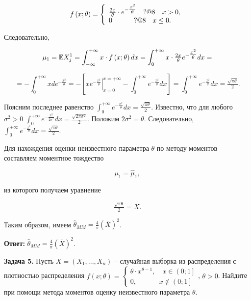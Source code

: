 \[f\left(x;\theta \right)=\left\{\begin{array}{l} {{\tfrac{2x}{\theta }} \cdot e^{-{\tfrac{x^{2} }{\theta }} } \quad {\rm ?@8}\quad x>0,} \\ {0\quad \quad \quad \, {\rm ?@8}\quad x\le 0.} \end{array}\right. \] 

Следовательно,

\[\mu _{1} ={\rm {\mathbb E}}X_{j}^{1} =\int _{-\infty }^{+\infty }x\cdot f\left(x;\theta \right)dx =\int _{0}^{+\infty }x\cdot {\tfrac{2x}{\theta }} e^{-{\tfrac{x^{2} }{\theta }} } dx =\] 

\[=-\int _{0}^{+\infty }xde^{-{\tfrac{x^{2} }{\theta }} }  =-\left[\left. xe^{-{\tfrac{x^{2} }{\theta }} } \right|_{x=0}^{x=+\infty } -\int _{0}^{+\infty }e^{-{\tfrac{x^{2} }{\theta }} } dx \right]=\int _{0}^{+\infty }e^{-{\tfrac{x^{2} }{\theta }} } dx ={\tfrac{\sqrt{\pi \theta } }{2}} .\] 

Поясним последнее равенство $\int _{0}^{+\infty }e^{-{\tfrac{x^{2} }{\theta }} } dx ={\tfrac{\sqrt{\pi \theta } }{2}} $. Известно, что для любого $\sigma ^{2} >0$ $\int _{0}^{+\infty }e^{-{\tfrac{x^{2} }{2\sigma ^{2} }} } dx ={\tfrac{\sqrt{2\pi \sigma ^{2} } }{2}} $. Положим $2\sigma ^{2} =\theta $. Следовательно, $\int _{0}^{+\infty }e^{-{\tfrac{x^{2} }{\theta }} } dx ={\tfrac{\sqrt{\pi \theta } }{2}} $.

Для нахождения оценки неизвестного параметра $\theta $ по методу моментов составляем моментное тождество 

\[\mu _{1} =\widehat{\mu }_{1} ,\] 

из которого получаем уравнение

\[{\tfrac{\sqrt{\pi \theta } }{2}} =\overline{X}.\] 

Таким образом, имеем $\widehat{\theta }_{MM} =\frac{4}{\pi } \left(\overline{X}\right)^{2} $.

\textbf{Ответ: }$\widehat{\theta }_{MM} =\frac{4}{\pi } \left(\overline{X}\right)^{2} $.

\textbf{Задача 5.} Пусть $X=\left(X_{1} ,...,X_{n} \right)$ -- случайная выборка из распределения с плотностью распределения $f\left(x;\theta \right)=\left\{\begin{array}{l} {\theta \cdot x^{\theta -1} ,\quad x\in \left(0;1\right]} \\ {0,\quad \quad \quad \; x\notin \left(0;1\right]} \end{array}\right. $, $\theta >0$. Найдите при помощи метода моментов оценку неизвестного параметра $\theta $.



